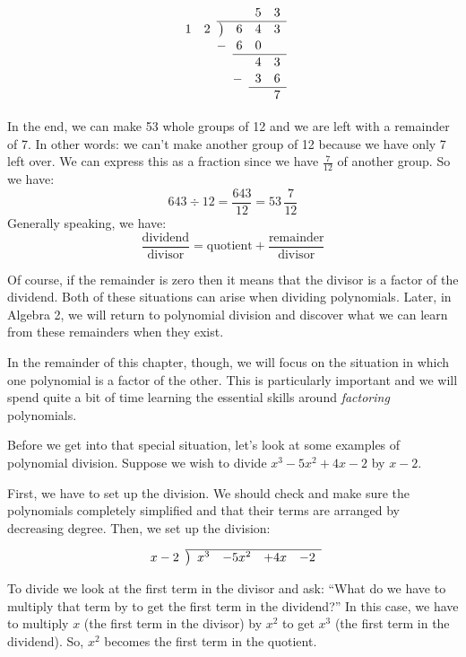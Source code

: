 \[
\renewcommand\arraystretch{1.1}
\begin{array}{*2r @{\hskip\arraycolsep}c@{\hskip\arraycolsep} *3r}
		&&&		~&5&3\\
\cline{3-6}
1&2		&\big)&		6&4&3\\
		&&-&		6&0&~\\
\cline{4-6}
		&&&		~&4&3\\
		&&&		-&3&6\\
\cline{5-6}
		&&&		~&~&7\\
\end{array}
\]

In the end, we can make 53 whole groups of 12 and we are left with a remainder of 7. In other words: we can't make another group of 12 because we have only 7 left over. We can express this as a fraction since we have $\frac{7}{12}$ of another group. So we have:
\[643 \div 12 = \frac{643}{12} = 53\,\frac{7}{12}\]
Generally speaking, we have:
\[\frac{\text{dividend}}{\text{divisor}} = \text{quotient}+\frac{\text{remainder}}{\text{divisor}}\]

Of course, if the remainder is zero then it means that the divisor is a factor of the dividend. Both of these situations can arise when dividing polynomials. Later, in Algebra 2, we will return to polynomial division and discover what we can learn from these remainders when they exist.

In the remainder of this chapter, though, we will focus on the situation in which one polynomial is a factor of the other. This is particularly important and we will spend quite a bit of time learning the essential skills around \textit{factoring} polynomials.

Before we get into that special situation, let's look at some examples of polynomial division. Suppose we wish to divide $x^3-5x^2+4x-2$ by $x-2$.

First, we have to set up the division. We should check and make sure the polynomials completely simplified and that their terms are arranged by decreasing degree. Then, we set up the division:

\[
\renewcommand\arraystretch{1.1}
\begin{array}{*1r @{\hskip\arraycolsep}c@{\hskip\arraycolsep} *4r}
\cline{2-6}
x-2		&\big)	&x^3&-5x^2&+4x&-2\\
\end{array}
\]

To divide we look at the first term in the divisor and ask: ``What do we have to multiply that term by to get the first term in the dividend?'' In this case, we have to multiply $x$ (the first term in the divisor) by $x^2$ to get $x^3$ (the first term in the dividend). So, $x^2$ becomes the first term in the quotient.

